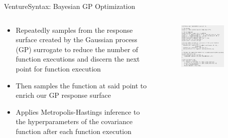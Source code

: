 \documentclass[AERbeamer%
              ,optEnglish%
              ,optBiber%
              ,optBibstyleAlphabetic%
              ,optBeamerClassicFormat%
              ]{AERlatex}%
\begin{document}
\begin{frame}[c]{Venture}{Syntax: Bayesian GP Optimization}
    \centering
    \begin{columns}[T]
        \begin{column}{0.38\textwidth}
            \centering
            \begin{itemize}
                \item Repeatedly samples from the response surface created by the Gaussian process (GP) surrogate to
                      reduce the number of function executions and discern the next point for function execution
                \item Then samples the function at said point to enrich our GP response surface
                \item Applies Metropolis-Hastings inference to the hyperparameters of the covariance function after
                      each function execution
            \end{itemize}
        \end{column}
        \begin{column}{0.6\textwidth}
            \centering
            \begin{figure}
                \centering
                \includegraphics[width=0.8\textwidth]{VentureBayesOptExample.png}
            \end{figure}
        \end{column}
    \end{columns}
\end{frame}
\end{document}
